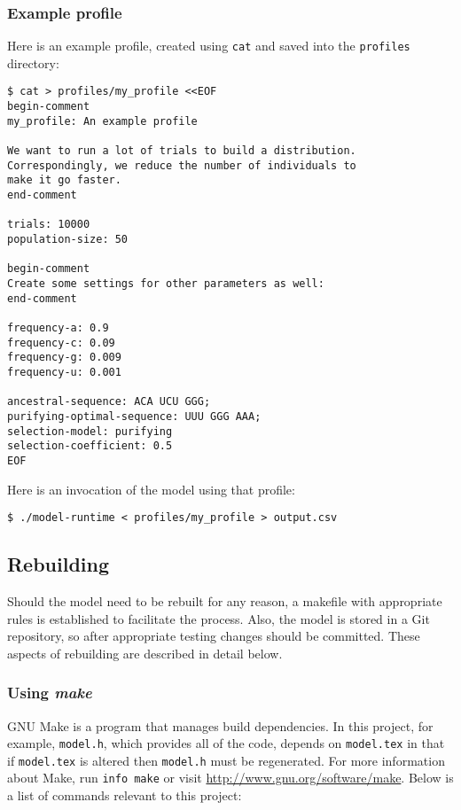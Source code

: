 \documentclass{article}
\begin{document}
      \subsubsection{Example profile}
        \label{sec:example-profile}

        Here is an example profile, created using \verb|cat| and saved into the
        \verb|profiles| directory:

        \begin{verbatim}
$ cat > profiles/my_profile <<EOF
begin-comment
my_profile: An example profile

We want to run a lot of trials to build a distribution.
Correspondingly, we reduce the number of individuals to
make it go faster.
end-comment

trials: 10000
population-size: 50

begin-comment
Create some settings for other parameters as well:
end-comment

frequency-a: 0.9
frequency-c: 0.09
frequency-g: 0.009
frequency-u: 0.001

ancestral-sequence: ACA UCU GGG;
purifying-optimal-sequence: UUU GGG AAA;
selection-model: purifying
selection-coefficient: 0.5
EOF
        \end{verbatim}

        Here is an invocation of the model using that profile:

        \begin{verbatim}
$ ./model-runtime < profiles/my_profile > output.csv
        \end{verbatim}

    \subsection{Rebuilding}
      \label{sec:rebuilding}
    
      Should the model need to be rebuilt for any reason, a makefile with
      appropriate rules is established to facilitate the process. Also, the
      model is stored in a Git repository, so after appropriate testing changes
      should be committed. These aspects of rebuilding are described in detail
      below.

      \subsubsection{Using {\em make}}
        \label{sec:make}

        GNU Make is a program that manages build dependencies. In this project,
        for example, \verb|model.h|, which provides all of the code, depends on
        \verb|model.tex| in that if \verb|model.tex| is altered then
        \verb|model.h| must be regenerated. For more information about Make, run
        \verb|info make| or visit \url{http://www.gnu.org/software/make}. Below
        is a list of commands relevant to this project:
\end{document}
